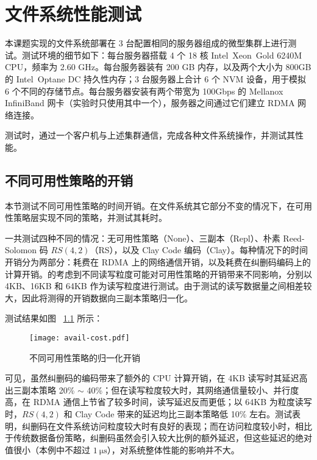 
\chapter{文件系统性能测试}
\label{cha:evaluation}


本课题实现的文件系统部署在 3 台配置相同的服务器组成的微型集群上进行测试。测试环境的细节如下：每台服务器搭载 4 个 18 核 Intel\textregistered ~Xeon\textregistered ~Gold 6240M CPU，频率为 2.60 GHz。每台服务器装有 200 GB 内存，以及两个大小为 800GB 的 Intel\textregistered ~Optane\textsuperscript{\texttrademark} DC 持久性内存；3 台服务器上合计 6 个 NVM 设备，用于模拟 6 个不同的存储节点。每台服务器安装有两个带宽为 100Gbps 的 Mellanox InfiniBand 网卡（实验时只使用其中一个），服务器之间通过它们建立 RDMA 网络连接。

测试时，通过一个客户机与上述集群通信，完成各种文件系统操作，并测试其性能。

\section{不同可用性策略的开销}
\label{sec:ch4_avail_cost}

本节测试不同可用性策略的时间开销。在文件系统其它部分不变的情况下，在可用性策略层实现不同的策略，并测试其耗时。

一共测试四种不同的情况：无可用性策略（None）、三副本（Repl）、朴素 Reed-Solomon 码 $RS(4, 2)$（RS），以及 Clay Code 编码（Clay）。每种情况下的时间开销分为两部分：耗费在 RDMA 上的网络通信开销，以及耗费在纠删码编码上的计算开销。的考虑到不同读写粒度可能对可用性策略的开销带来不同影响，分别以 4KB、16KB 和 64KB 作为读写粒度进行测试。由于测试的读写数据量之间相差较大，因此将测得的开销数据向三副本策略归一化。

测试结果如图 ~\ref{fig:avail_cost} 所示：

\begin{figure}[H]
    \centering
    \texttt{[image: avail-cost.pdf]}
    \caption{不同可用性策略的归一化开销}
    \label{fig:avail_cost}
\end{figure}

可见，虽然纠删码的编码带来了额外的 CPU 计算开销，在 4KB 读写时其延迟高出三副本策略 20\% $\sim$ 40\%；但在读写粒度较大时，其网络通信量较小、并行度高，在 RDMA 通信上节省了较多时间，读写延迟反而更低；以 64KB 为粒度读写时，$RS(4, 2)$ 和 Clay Code 带来的延迟均比三副本策略低 10\% 左右。测试表明，纠删码在文件系统访问粒度较大时有良好的表现；而在访问粒度较小时，相比于传统数据备份策略，纠删码虽然会引入较大比例的额外延迟，但这些延迟的绝对值很小（本例中不超过 $\SI{1}{\us}$），对系统整体性能的影响并不大。

